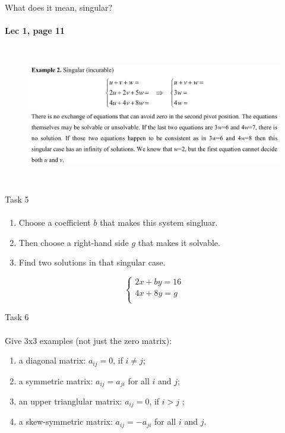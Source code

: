 \documentclass[aspectratio=169]{beamer}
\begin{document}
\begin{frame}[t]{What does it mean, singular?}
\framesubtitle{Lec 1, page 11}
    \begin{figure}[H]
        \centering\includegraphics[height=6cm,width=1\textwidth,keepaspectratio]{1.png}
        \label{fig:1.png}
    \end{figure}
\end{frame}


\begin{frame}[t]{Task 5}
\framesubtitle{}
    \begin{enumerate}
        \item Choose a coefficient $b$ that makes this system singluar.
        \item Then choose a right-hand side $g$ that makes it solvable.
        \item Find two solutions in that singular case.
    \end{enumerate}
    \begin{equation*}
        \left\{\begin{matrix}
            2x + by = 16 \\ 
            4x + 8y = g \\ 
            \end{matrix}\right.
        \end{equation*}
\end{frame}

\begin{frame}[t]{Task 6}
\framesubtitle{}
    Give 3x3 examples (not just the zero matrix):
    \begin{enumerate}
        \item a diagonal matrix: $a_{ij}=0$, if $i \neq j$;
        \item a symmetric matrix: $a_{ij} = a_{ji}$ for all $i$ and $j$;
        \item an upper trianglular matrix: $a_{ij}=0$, if $i>j$ ;
        \item a skew-symmetric matrix: $a_{ij} = -a_{ji}$ for all $i$ and $j$.
    \end{enumerate}
\end{frame}
\end{document}
